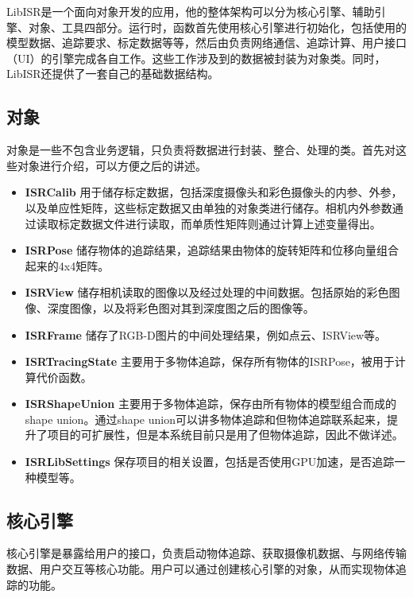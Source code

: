 LibISR是一个面向对象开发的应用，他的整体架构可以分为核心引擎、辅助引擎、对象、工具四部分。运行时，函数首先使用核心引擎进行初始化，包括使用的模型数据、追踪要求、标定数据等等，然后由负责网络通信、追踪计算、用户接口（UI）的引擎完成各自工作。这些工作涉及到的数据被封装为对象类。同时，LibISR还提供了一套自己的基础数据结构。

\subsection{对象}

对象是一些不包含业务逻辑，只负责将数据进行封装、整合、处理的类。首先对这些对象进行介绍，可以方便之后的讲述。

\begin{itemize}
    \item \textbf{ISRCalib}
用于储存标定数据，包括深度摄像头和彩色摄像头的内参、外参，以及单应性矩阵，这些标定数据又由单独的对象类进行储存。相机内外参数通过读取标定数据文件进行读取，而单质性矩阵则通过计算上述变量得出。
    
    \item \textbf{ISRPose}
储存物体的追踪结果，追踪结果由物体的旋转矩阵和位移向量组合起来的4x4矩阵。
    
    \item \textbf{ISRView}
储存相机读取的图像以及经过处理的中间数据。包括原始的彩色图像、深度图像，以及将彩色图对其到深度图之后的图像等。

    \item \textbf{ISRFrame}
储存了RGB-D图片的中间处理结果，例如点云、ISRView等。
    
    \item \textbf{ISRTracingState}
主要用于多物体追踪，保存所有物体的ISRPose，被用于计算代价函数。

    \item \textbf{ISRShapeUnion}
主要用于多物体追踪，保存由所有物体的模型组合而成的shape union。通过shape union可以讲多物体追踪和但物体追踪联系起来，提升了项目的可扩展性，但是本系统目前只是用了但物体追踪，因此不做详述。

    \item \textbf{ISRLibSettings}
保存项目的相关设置，包括是否使用GPU加速，是否追踪一种模型等。
\end{itemize}

\subsection{核心引擎}

核心引擎是暴露给用户的接口，负责启动物体追踪、获取摄像机数据、与网络传输数据、用户交互等核心功能。用户可以通过创建核心引擎的对象，从而实现物体追踪的功能。

